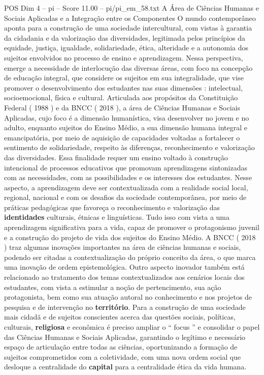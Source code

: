 \begin{textsample}{POS Dim 4 – pi – Score 11.00 – pi/pi\_em\_58.txt}  \label{ex:f4_pos_124}
A Área de Ciências Humanas e Sociais Aplicadas e a Integração entre os Componentes O mundo contemporâneo aponta para a construção de uma sociedade intercultural, com vistas à garantia da cidadania e da valorização das diversidades, legitimada pelos princípios da equidade, justiça, igualdade, solidariedade, ética, alteridade e a autonomia dos sujeitos envolvidos no processo de ensino e aprendizagem.
Nessa perspectiva, emerge a necessidade de interlocução das diversas áreas, com foco na concepção de educação integral, que considere os sujeitos em sua integralidade, que vise promover o desenvolvimento dos estudantes nas suas dimensões : intelectual, socioemocional, física e cultural.
Articulada aos propósitos da Constituição Federal ( 1988 ) e da BNCC ( 2018 ), a área de Ciências Humanas e Sociais Aplicadas, cujo foco é a dimensão humanística, visa desenvolver no jovem e no adulto, enquanto sujeitos do Ensino Médio, a sua dimensão humana integral e emancipatória, por meio de aquisição de capacidades voltadas a fortalecer o sentimento de solidariedade, respeito às diferenças, reconhecimento e valorização das diversidades.
Essa finalidade requer um ensino voltado à construção intencional de processos educativos que promovam aprendizagens sintonizadas com as necessidades, com as possibilidades e os interesses dos estudantes.
Nesse aspecto, a aprendizagem deve ser contextualizada com a realidade social local, regional, nacional e com os desafios da sociedade contemporânea, por meio de práticas pedagógicas que favoreça o reconhecimento e valorização das \textbf{identidades} culturais, étnicas e linguísticas.
Tudo isso com vista a uma aprendizagem significativa para a vida, capaz de promover o protagonismo juvenil e a construção do projeto de vida dos sujeitos do Ensino Médio.
A BNCC ( 2018 ) traz algumas inovações importantes na área de ciências humanas e sociais, podendo ser citadas a contextualização do próprio conceito da área, o que marca uma inovação de ordem epistemológica.
Outro aspecto inovador também está relacionado ao tratamento dos temas contextualizados aos cenários locais dos estudantes, com vista a estimular a noção de pertencimento, sua ação protagonista, bem como sua atuação autoral no conhecimento e nos projetos de pesquisa e de intervenção no \textbf{território}.
Para a construção de uma sociedade mais cidadã e de sujeitos conscientes acerca das questões sociais, políticas, culturais, \textbf{religiosa} e econômica é preciso ampliar o “ focus ” e consolidar o papel das Ciências Humanas e Sociais Aplicadas, garantindo o legítimo e necessário espaço de articulação entre todas as ciências, oportunizando a formação de sujeitos comprometidos com a coletividade, com uma nova ordem social que desloque a centralidade do \textbf{capital} para a centralidade ética da vida humana.

\end{textsample}
